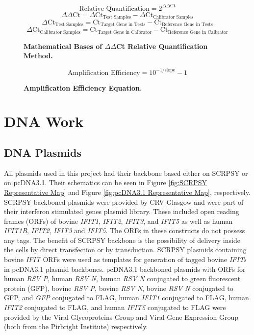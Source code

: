 \begin{figure}
$$\mbox{Relative Quantification} = 2^{\Delta\Delta \mbox{Ct}}$$
$$\Delta\Delta \mbox{Ct} = \Delta \mbox{Ct}_{\mbox{Test Samples}}-\Delta \mbox{Ct}_{\mbox{Calibrator Samples}}$$
$$\Delta \mbox{Ct}_{\mbox{Test Samples}} = \mbox{Ct}_{\mbox{Target Gene in Tests}}-\mbox{Ct}_{\mbox{Reference Gene in Tests}}$$
$$\Delta \mbox{Ct}_{\mbox{Calibrator Samples}} = \mbox{Ct}_{\mbox{Target Gene in Calbrator}}-\mbox{Ct}_{\mbox{Reference Gene in Calbrator}}$$
\caption[Mathematical Bases of $\Delta\Delta$Ct Relative Quantification Method.]{\textbf{Mathematical Bases of $\Delta\Delta$Ct Relative Quantification Method.}}
\label{eq:Mathematical Bases of delta delta Ct Relative Quantification Method}
\end{figure}

\begin{figure}
$$\mbox{Amplification Efficiency} = 10^{-1/\mbox{slope}}-1$$
\caption[Amplification Efficiency Equation.]{\textbf{Amplification Efficiency Equation.}}
\label{eq:Amplification Efficiency Equation}
\end{figure}




\section{DNA Work} \label{sec:DNA Work}
\subsection{DNA Plasmids} \label{subsec:DNA Plasmids}
All plasmids used in this project had their backbone based either on SCRPSY or on pcDNA3.1. Their schematics can be seen in Figure \ref{fig:SCRPSY Representative Map} and Figure \ref{fig:pcDNA3.1 Representative Map}, respectively. SCRPSY backboned plasmids were provided by CRV Glasgow and were part of their interferon stimulated genes plasmid library. These included open reading frames (ORFs) of bovine \textit{IFIT1}, \textit{IFIT2}, \textit{IFIT3}, and \textit{IFIT5} as well as human \textit{IFIT1B}, \textit{IFIT2}, \textit{IFIT3} and \textit{IFIT5}. The ORFs in these constructs do not possess any tags. The benefit of SCRPSY backbone is the possibility of delivery inside the cells by direct transfection or by transduction. SCRPSY plasmids containing bovine \textit{IFIT} ORFs were used as templates for generation of tagged bovine \textit{IFITs} in pcDNA3.1 plasmid backbones. pcDNA3.1 backboned plasmids with ORFs for human \textit{RSV P}, human \textit{RSV N}, human \textit{RSV N} conjugated to green fluorescent protein (GFP), bovine \textit{RSV P}, bovine \textit{RSV N}, bovine \textit{RSV N} conjugated to GFP, and \textit{GFP} conjugated to FLAG, human \textit{IFIT1} conjugated to FLAG, human \textit{IFIT2} conjugated to FLAG, and human \textit{IFIT5} conjugated to FLAG were provided by the Viral Glycoproteins Group and Viral Gene Expression Group (both from the Pirbright Institute) respectively.

